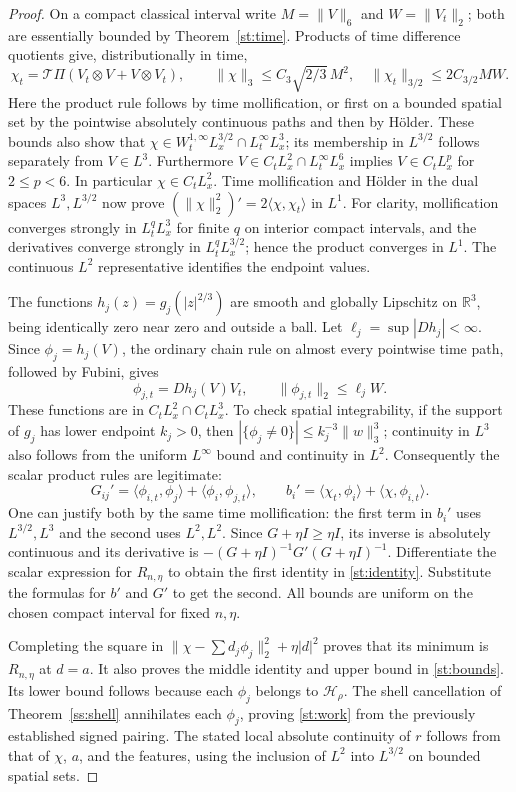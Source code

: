 \begin{proof}
On a compact classical interval write $M=\|V\|_6$ and $W=\|V_t\|_2$;
both are essentially bounded by Theorem~\ref{st:time}. Products of
time difference quotients give, distributionally in time,
\[
 \chi_t=\mathcal T\Pi(V_t\otimes V+V\otimes V_t),\qquad
 \|\chi\|_3\le C_3\sqrt{2/3}\,M^2,\quad
 \|\chi_t\|_{3/2}\le2C_{3/2}MW.
\]
Here the product rule follows by time mollification, or first on a
bounded spatial set by the pointwise absolutely continuous paths and
then by H\"older. These bounds also show that $\chi\in
W^{1,\infty}_tL^{3/2}_x\cap L^\infty_tL^3_x$; its membership in
$L^{3/2}$ follows separately from $V\in L^3$.
Furthermore $V\in C_tL^2_x\cap L^\infty_tL^6_x$ implies
$V\in C_tL^p_x$ for $2\le p<6$. In particular $\chi\in C_tL^2_x$.
Time mollification and H\"older in the dual spaces $L^3,L^{3/2}$ now
prove
$(\|\chi\|_2^2)'=2\langle\chi,\chi_t\rangle$ in $L^1$.
For clarity, mollification converges strongly in $L^q_tL^3_x$ for
finite $q$ on interior compact intervals, and the derivatives converge
strongly in $L^q_tL^{3/2}_x$; hence the product converges in $L^1$.
The continuous $L^2$ representative identifies the endpoint values.

The functions $h_j(z)=g_j(|z|^{2/3})$ are smooth and globally Lipschitz
on $\mathbb R^3$, being identically zero near zero and outside a ball.
Let $\ell_j=\sup|Dh_j|<\infty$. Since $\phi_j=h_j(V)$, the ordinary
chain rule on almost every pointwise time path, followed by Fubini, gives
\[
 \phi_{j,t}=Dh_j(V)V_t,\qquad
 \|\phi_{j,t}\|_2\le\ell_j W.
\]
These functions are in $C_tL^2_x\cap C_tL^3_x$. To check spatial
integrability, if the support of $g_j$ has lower endpoint $k_j>0$,
then $|\{\phi_j\ne0\}|\le k_j^{-3}\|w\|_3^3$; continuity in $L^3$
also follows from the uniform $L^\infty$ bound and continuity in $L^2$.
Consequently the scalar product rules are legitimate:
\[
 G_{ij}'=\langle\phi_{i,t},\phi_j\rangle+
          \langle\phi_i,\phi_{j,t}\rangle,\qquad
 b_i'=\langle\chi_t,\phi_i\rangle+\langle\chi,\phi_{i,t}\rangle.
\]
One can justify both by the same time mollification: the first term
in $b_i'$ uses $L^{3/2},L^3$ and the second uses $L^2,L^2$.
Since $G+\eta I\ge\eta I$, its inverse is absolutely continuous and
its derivative is $-(G+\eta I)^{-1}G'(G+\eta I)^{-1}$.
Differentiate the scalar expression for $R_{n,\eta}$ to obtain the
first identity in \eqref{st:identity}. Substitute the formulas for
$b'$ and $G'$ to get the second. All bounds are uniform on the chosen
compact interval for fixed $n,\eta$.

Completing the square in
$\|\chi-\sum d_j\phi_j\|_2^2+\eta|d|^2$ proves that its minimum is
$R_{n,\eta}$ at $d=a$. It also proves the middle identity and upper
bound in \eqref{st:bounds}. Its lower bound follows because each
$\phi_j$ belongs to $\mathcal H_\rho$. The shell cancellation of
Theorem~\ref{ss:shell} annihilates each $\phi_j$, proving
\eqref{st:work} from the previously established signed pairing.
The stated local absolute continuity of $r$ follows from that of
$\chi$, $a$, and the features, using the inclusion of $L^2$ into
$L^{3/2}$ on bounded spatial sets.
\end{proof}

